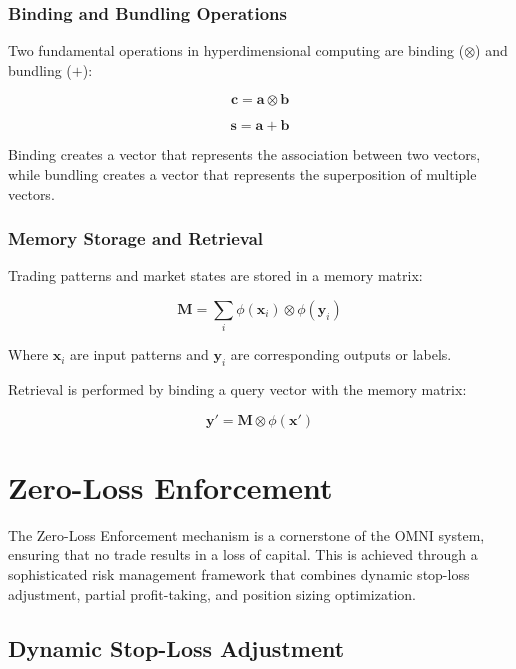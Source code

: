 \documentclass[11pt,a4paper]{article}
\begin{document}
\subsubsection{Binding and Bundling Operations}

Two fundamental operations in hyperdimensional computing are binding ($\otimes$) and bundling ($+$):

\begin{equation}
    \mathbf{c} = \mathbf{a} \otimes \mathbf{b}
\end{equation}

\begin{equation}
    \mathbf{s} = \mathbf{a} + \mathbf{b}
\end{equation}

Binding creates a vector that represents the association between two vectors, while bundling creates a vector that represents the superposition of multiple vectors.

\subsubsection{Memory Storage and Retrieval}

Trading patterns and market states are stored in a memory matrix:

\begin{equation}
    \mathbf{M} = \sum_{i} \phi(\mathbf{x}_i) \otimes \phi(\mathbf{y}_i)
\end{equation}

Where $\mathbf{x}_i$ are input patterns and $\mathbf{y}_i$ are corresponding outputs or labels.

Retrieval is performed by binding a query vector with the memory matrix:

\begin{equation}
    \mathbf{y'} = \mathbf{M} \otimes \phi(\mathbf{x'})
\end{equation}

\section{Zero-Loss Enforcement}

The Zero-Loss Enforcement mechanism is a cornerstone of the OMNI system, ensuring that no trade results in a loss of capital. This is achieved through a sophisticated risk management framework that combines dynamic stop-loss adjustment, partial profit-taking, and position sizing optimization.

\subsection{Dynamic Stop-Loss Adjustment}
\end{document}
